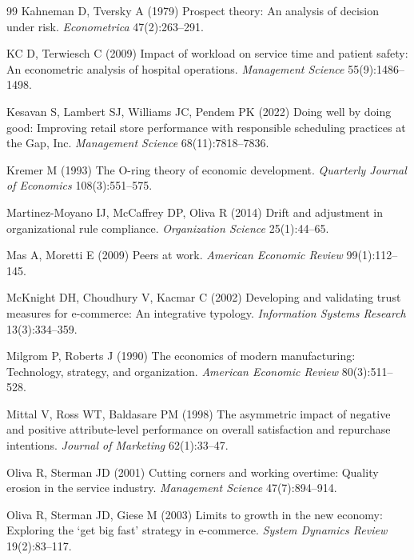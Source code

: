 \documentclass[msom,dblanonrev]{informs4}
\begin{document}
\begin{thebibliography}{99}
Kahneman D, Tversky A (1979) Prospect theory: An analysis of decision under risk.
\textit{Econometrica} 47(2):263--291.

KC D, Terwiesch C (2009) Impact of workload on service time and patient safety: An econometric analysis of hospital operations.
\textit{Management Science} 55(9):1486--1498.

Kesavan S, Lambert SJ, Williams JC, Pendem PK (2022) Doing well by doing good: Improving retail store performance with responsible scheduling practices at the Gap, Inc.
\textit{Management Science} 68(11):7818--7836.

Kremer M (1993) The O-ring theory of economic development.
\textit{Quarterly Journal of Economics} 108(3):551--575.

Martinez-Moyano IJ, McCaffrey DP, Oliva R (2014) Drift and adjustment in organizational rule compliance.
\textit{Organization Science} 25(1):44--65.

Mas A, Moretti E (2009) Peers at work.
\textit{American Economic Review} 99(1):112--145.

McKnight DH, Choudhury V, Kacmar C (2002) Developing and validating trust measures for e-commerce: An integrative typology.
\textit{Information Systems Research} 13(3):334--359.

Milgrom P, Roberts J (1990) The economics of modern manufacturing: Technology, strategy, and organization.
\textit{American Economic Review} 80(3):511--528.

Mittal V, Ross WT, Baldasare PM (1998) The asymmetric impact of negative and positive attribute-level performance on overall satisfaction and repurchase intentions.
\textit{Journal of Marketing} 62(1):33--47.

Oliva R, Sterman JD (2001) Cutting corners and working overtime: Quality erosion in the service industry.
\textit{Management Science} 47(7):894--914.

Oliva R, Sterman JD, Giese M (2003) Limits to growth in the new economy: Exploring the `get big fast' strategy in e-commerce.
\textit{System Dynamics Review} 19(2):83--117.


\end{thebibliography}
\end{document}
